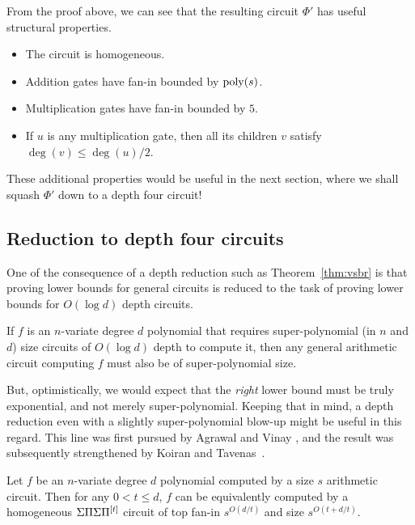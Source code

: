 \begin{remark}\label{remark:vsbr}
From the proof above, we can see that the resulting circuit $\Phi'$ has useful structural properties. 
\begin{itemize}
  \item The circuit is homogeneous. 
  \item Addition gates have fan-in bounded by $\mathrm{poly}(s)$. 
  \item Multiplication gates have fan-in bounded by $5$. 
  \item If $u$ is any multiplication gate, then all its children $v$ satisfy $\deg(v)\leq \deg(u)/2$. 
\end{itemize}
\end{remark}

These additional properties would be useful in the next section, where we shall squash $\Phi'$ down to a depth four circuit!

\subsection{Reduction to depth four circuits}

One of the consequence of a depth reduction such as Theorem~\ref{thm:vsbr} is that proving lower bounds for general circuits is reduced to the task of proving lower bounds for $O(\log d)$ depth circuits. 

\begin{corollary}\label{cor:vsbr-contra}
If $f$ is an $n$-variate degree $d$ polynomial that requires super-polynomial (in $n$ and $d$) size circuits of $O(\log d)$ depth to compute it, then any general arithmetic circuit computing $f$ must also be of super-polynomial size. 
\end{corollary}

But, optimistically, we would expect that the \emph{right} lower bound must be truly exponential, and not merely super-polynomial. Keeping that in mind, a depth reduction even with a slightly super-polynomial blow-up might be useful in this regard. This line was first pursued by Agrawal and Vinay \cite{av08}, and the result was subsequently strengthened by Koiran \cite{koiran} and Tavenas~\cite{Tav13}. 

\begin{theorem} \label{thm:av}
Let $f$ be an $n$-variate degree $d$ polynomial computed by a size $s$ arithmetic circuit. Then for any $0< t \leq d$, $f$ can be equivalently computed by a homogeneous $\Sigma\Pi\Sigma\Pi^{[t]}$ circuit of top fan-in $s^{O(d/t)}$ and size $s^{O(t + d/t)}$. 
\end{theorem}


